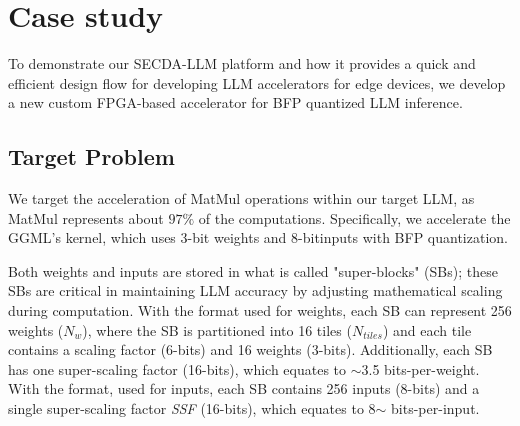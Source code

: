 
\section{Case study}

To demonstrate our SECDA-LLM platform and how it provides a quick and efficient design flow for developing LLM accelerators for edge devices, we develop a new custom FPGA-based accelerator for BFP quantized LLM inference.





\subsection{Target Problem}

We target the acceleration of MatMul operations within our target LLM, as MatMul represents about $97\%$ of the computations.
Specifically, we accelerate the GGML's \qkernel kernel, which uses 3-bit weights and 8-bitinputs with BFP quantization.


Both weights and inputs are stored in what is called "super-blocks" (SBs); these SBs are critical in maintaining LLM accuracy by adjusting mathematical scaling during computation.
With the \qkw format used for weights, each SB can represent 256 weights ($N_w$), where the SB is partitioned into 16 tiles ($N_{tiles}$) and each tile contains a scaling factor (6-bits) and 16 weights (3-bits). Additionally, each SB has one super-scaling factor (16-bits), which equates to $\sim$3.5 bits-per-weight.
With the \qki format, used for inputs, each SB contains 256 inputs (8-bits) and a single super-scaling factor \textit{SSF} (16-bits), which equates to 8$\sim$ bits-per-input.


